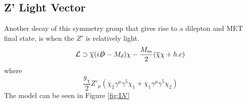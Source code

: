 \documentclass[12pt, a4paper]{book}
\begin{document}
\subsection{Z' Light Vector}
Another decay of this symmetry group that gives rise to a dilepton and MET final state, is when the $Z'$ is relatively light.
$$
\mathcal{L}\supset \overline{\chi}(i\slashed{D}-M_d)\chi - \frac{M_m}{2}(\overline{\chi}\chi + h.c)
$$
where
$$
\frac{g_\chi}{2}Z'_\mu(\overline{\chi}_2\gamma^\mu\gamma^5\chi_1 + \overline{\chi}_1\gamma^\mu\gamma^5\chi_2)
$$
The model can be seen in Figure \ref{fig:LV}
\begin{figure}[!ht]
    \centering
    \begin{tikzpicture}[x=0.75pt,y=0.75pt,yscale=-1,xscale=1]


\end{tikzpicture}
\end{figure}
\end{document}
